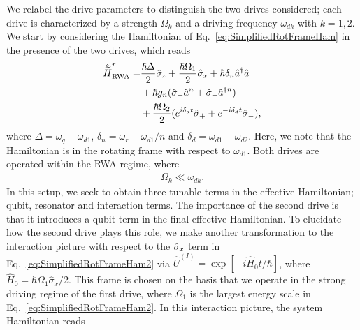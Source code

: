 We relabel the drive parameters to distinguish the two drives considered; each drive is characterized by a strength $\Omega_k$ and a driving frequency $\omega_{dk}$ with $k=1,2$. We start by considering the Hamiltonian of Eq.~\eqref{eq:SimplifiedRotFrameHam} in the presence of the two drives, which reads 
\begin{align}\label{eq:SimplifiedRotFrameHam2}
    \hat{\widetilde{H}}^r_{\text{RWA}} =&\frac{\hbar \Delta}{2}\hat{\sigma}_z +\frac{\hbar \Omega_1}{2}\hat{\sigma}_x + \hbar \delta_n\hat{a}^\dagger \hat{a} \nonumber\\&+ \hbar g_n(\hat{\sigma}_+\hat{a}^n +\hat{\sigma}_-\hat{a}^{\dagger n})\nonumber\\ &+\frac{\hbar\Omega_2}{2}(e^{i\delta_d t}\hat{\sigma}_+ +e^{-i\delta_d t}\hat{\sigma}_-), 
\end{align}
where $\Delta=\omega_q-\omega_{d1}$, $\delta_{n}=\omega_r-\omega_{d1}/n$ and $\delta_d=\omega_{d1}-\omega_{d2}$. Here, we note that the Hamiltonian is in the rotating frame with respect to $\omega_{d1}$. Both drives are operated within the RWA regime, where
\begin{align*}
    \Omega_k \ll \omega_{dk}.
\end{align*}
In this setup, we seek to obtain three tunable terms in the effective Hamiltonian; qubit, resonator and interaction terms. The importance of the second drive is that it introduces a qubit term in the final effective Hamiltonian. To elucidate how the second drive plays this role, we make another transformation to the interaction picture with respect to the $\hat{\sigma}_x$ term in Eq.~\eqref{eq:SimplifiedRotFrameHam2} via $\hat{U}^{(I)}=\exp[-i \hat{H}_0 t/\hbar]$, where $\hat{H}_0=\hbar\Omega_1\hat{\sigma}_x/2$. This frame is chosen on the basis that we operate in the strong driving regime of the first drive, where $\Omega_1$ is the largest energy scale in Eq.~\eqref{eq:SimplifiedRotFrameHam2}. In this interaction picture, the system Hamiltonian reads

